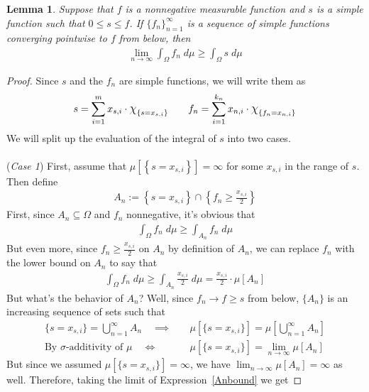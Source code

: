 \documentclass[12pt]{article}
\theoremstyle{plain}
\newtheorem{lem}[thm]{Lemma}
\theoremstyle{definition}
\theoremstyle{remark}
\newcommand*{\Chi}{\mbox{\large$\chi$}} %
\newcommand{\ra}{\rightarrow}
\newcommand{\sumim}{\sum^m_{i=1}}
\newcommand{\ninf}{_{n=1}^\infty}
\newcommand{\limn}{\lim_{n\rightarrow\infty}}
\begin{document}
\begin{lem}
Suppose that $f$ is a nonnegative measurable function and $s$ is a
simple function such that $0\leq s\leq f$. If $\{f_n\}\ninf$ is a
sequence of simple functions converging pointwise to $f$ from below,
then
\begin{align*}
  \limn \int_\Omega f_n\;d\mu \geq \int_\Omega s \; d\mu
\end{align*}
\end{lem}
\begin{proof}
Since $s$ and the $f_n$ are simple functions, we will write them as
\begin{align*}
  s = \sumim x_{s,i} \cdot \Chi_{\left\{ s=x_{s,i}\right\}}
  \qquad
  f_n = \sum_{i=1}^{k_n} x_{n,i} \cdot
  \Chi_{\left\{ f_n = x_{n,i} \right\}}
\end{align*}
We will split up the evaluation of the integral of $s$ into two cases.
\\
\\
(\emph{Case 1})
First, assume that
$\mu[\left\{ s=x_{s,i}\right\}]=\infty$
for some $x_{s,i}$ in the range of $s$. Then define
\begin{align*}
  A_n := \left\{ s=x_{s,i} \right\}
  \cap \left\{ f_n\geq \frac{x_{s,i}}{2} \right\}
\end{align*}
First, since $A_n\subseteq \Omega$ and $f_n$ nonnegative, it's obvious
that
\begin{align*}
  \int_\Omega f_n \; d\mu
  \geq
  \int_{A_n} f_n \; d\mu
\end{align*}
But even more, since $f_n \geq \frac{x_{s,i}}{2}$ on $A_n$ by definition
of $A_n$, we can replace $f_n$ with the lower bound on $A_n$ to say that
\begin{align}
  \int_\Omega f_n \; d\mu
  \geq
  \int_{A_n} \frac{x_{s,i}}{2} \; d\mu
  =\frac{x_{s,i}}{2} \cdot \mu[A_n]
  \label{Anbound}
\end{align}
But what's the behavior of $A_n$? Well, since $f_n\ra f\geq s$ from
below, $\{A_n\}$ is an increasing sequence of sets such that
\begin{align*}
  \{s=x_{s,i}\} = \bigcup\ninf A_n
  \quad\implies&\quad
  \mu[\{s=x_{s,i}\}] = \mu\left[\bigcup\ninf A_n\right] \\
  \text{By $\sigma$-additivity of $\mu$}
  \quad \iff&\quad
  \mu[\{s=x_{s,i}\}] = \limn \mu\left[A_n\right]
\end{align*}
But since we assumed $\mu[\{s=x_{s,i}\}]=\infty$, we
have $\limn \mu[A_n]=\infty$ as well. Therefore, taking the limit of
Expression~\ref{Anbound} we get

\end{proof}
\end{document}
